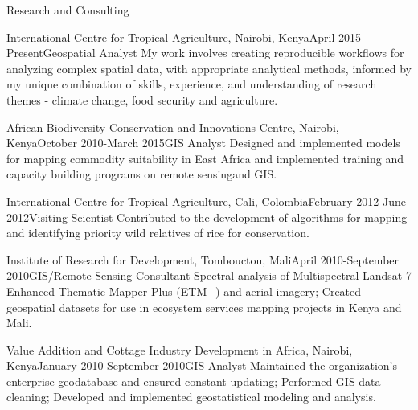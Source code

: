 \documentclass{resume} %
\begin{document}

\begin{rSection}{Research and Consulting}
\begin{pSubsection}{International Centre for Tropical Agriculture, }{Nairobi, Kenya}{April 2015-Present}{Geospatial Analyst}
{My work involves creating reproducible workflows for analyzing complex spatial data, with appropriate analytical methods, informed by my unique combination of skills, experience, and understanding of research themes - climate change, food security and agriculture.}
\end{pSubsection}

\begin{pSubsection}{African Biodiversity Conservation and Innovations Centre, }{Nairobi, Kenya}{October 2010-March 2015}{GIS Analyst}
{Designed and implemented models for mapping commodity suitability in East Africa and implemented training and capacity building programs on remote sensingand GIS.}
\end{pSubsection}


\begin{pSubsection}{International Centre for Tropical Agriculture, }{Cali, Colombia}{February 2012-June 2012}{Visiting Scientist}
{Contributed to the development of algorithms for mapping and identifying priority wild relatives of rice for conservation.}
\end{pSubsection}

\begin{pSubsection}{Institute of Research for Development, }{Tombouctou, Mali}{April 2010-September 2010}{GIS/Remote Sensing Consultant}
{Spectral analysis of Multispectral Landsat 7 Enhanced Thematic Mapper Plus (ETM+) and aerial imagery; Created geospatial datasets for use in ecosystem services mapping projects in Kenya and Mali.}
\end{pSubsection}

\begin{pSubsection}{Value Addition and Cottage Industry Development in Africa, }{Nairobi, Kenya}{January 2010-September 2010}{GIS Analyst}
{Maintained the organization's enterprise geodatabase and ensured constant updating; Performed GIS data cleaning; Developed and implemented geostatistical modeling and analysis.}
\end{pSubsection}


\end{rSection}
\end{document}
